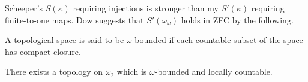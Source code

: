 \documentclass[11pt]{article}
\begin{document}
  \begin{remark}
    Scheeper's \(S(\kappa)\) requiring injections is stronger than my
    \(S'(\kappa)\) requiring finite-to-one maps. Dow suggests that
    \(S'(\omega_\omega)\) holds in ZFC by the following.
  \end{remark}

  \begin{definition}
    A topological space is said to be \(\omega\)-bounded if each countable
    subset of the space has compact closure.
  \end{definition}

  \begin{theorem}
    There exists a topology on \(\omega_2\) which
    is \(\omega\)-bounded and locally countable.
  \end{theorem}
\end{document}
